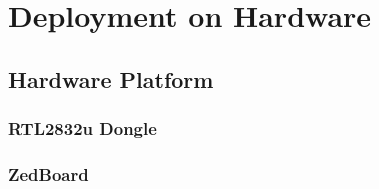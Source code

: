 \chapter{Deployment on Hardware}
\label{cha:DeploymentOnHardware}
  \section{Hardware Platform}
    \subsection{RTL2832u Dongle}
    \subsection{ZedBoard}

